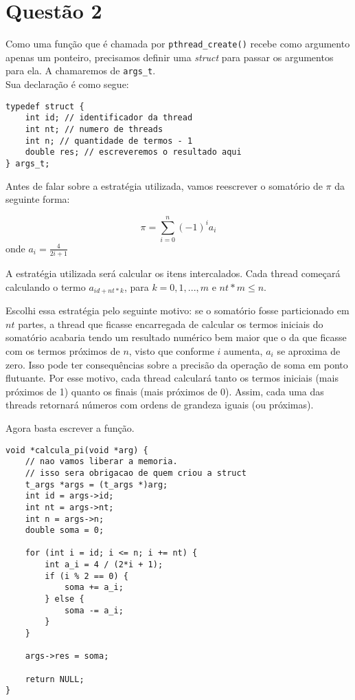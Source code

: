 \documentclass{article}
\begin{document}
\section*{Questão 2}

Como uma função que é chamada por \texttt{pthread\_create()} recebe como argumento apenas um ponteiro,
precisamos definir uma \emph{struct} para passar os argumentos para ela. A chamaremos de \texttt{args\_t}.\\
Sua declaração é como segue:

\begin{verbatim}
typedef struct {
	int id; // identificador da thread
	int nt; // numero de threads
	int n; // quantidade de termos - 1
	double res; // escreveremos o resultado aqui
} args_t;
\end{verbatim}

Antes de falar sobre a estratégia utilizada, vamos reescrever o somatório de $\pi$ da seguinte forma:
\begin{center}
	$$
	\pi = \sum_{i=0}^n{(-1)^ia_i} 
	$$
	onde $a_i = \frac{4}{2i+1}$
\end{center}

A estratégia utilizada será calcular os itens intercalados. Cada thread começará calculando o termo
$a_{id+nt*k}$, para $k=0,1,...,m$ e $nt*m \le n$.

Escolhi essa estratégia pelo seguinte motivo: se o somatório fosse particionado em $nt$ partes,
a thread que ficasse encarregada de calcular os termos iniciais do somatório acabaria tendo um
resultado numérico bem maior que o da que ficasse com os termos próximos de $n$, visto que conforme
$i$ aumenta, $a_i$ se aproxima de zero. Isso pode ter consequências sobre a precisão da
operação de soma em ponto flutuante. Por esse motivo, cada thread calculará tanto os termos iniciais
(mais próximos de 1) quanto os finais (mais próximos de 0). Assim, cada uma das threads retornará números
com ordens de grandeza iguais (ou próximas).

Agora basta escrever a função.

\begin{verbatim}
void *calcula_pi(void *arg) {
	// nao vamos liberar a memoria.
	// isso sera obrigacao de quem criou a struct
	t_args *args = (t_args *)arg;
	int id = args->id;
	int nt = args->nt;
	int n = args->n;
	double soma = 0;

	for (int i = id; i <= n; i += nt) {
		int a_i = 4 / (2*i + 1);
		if (i % 2 == 0) {
			soma += a_i;
		} else {
			soma -= a_i;
		}
	}

	args->res = soma;

	return NULL;
}
\end{verbatim}
\end{document}
